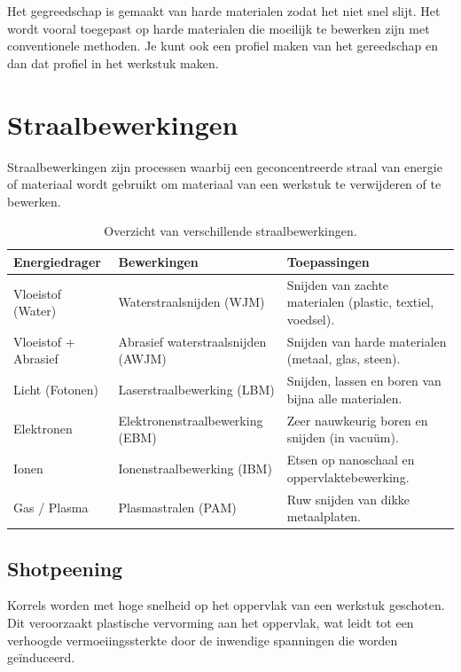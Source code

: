 \documentclass[a4paper,12pt,twoside]{report}
\begin{document}
Het gegreedschap is gemaakt van harde materialen zodat het niet snel slijt.
\newline
Het wordt vooral toegepast op harde materialen die moeilijk te bewerken zijn met conventionele methoden.
\newline
Je kunt ook een profiel maken van het gereedschap en dan dat profiel in het werkstuk maken.
\newline


\section{Straalbewerkingen}
Straalbewerkingen zijn processen waarbij een geconcentreerde straal van energie of materiaal wordt gebruikt om materiaal van een werkstuk te verwijderen of te bewerken.


\begin{table}[ht]
	\centering
	\caption{Overzicht van verschillende straalbewerkingen.}
	\label{tab:straalbewerkingen}
	\begin{tabularx}{\textwidth}{|l|X|X|}
		\hline
		\textbf{Energiedrager} & \textbf{Bewerkingen}               & \textbf{Toepassingen}                                      \\
		\hline
		Vloeistof (Water)      & Waterstraalsnijden (WJM)           & Snijden van zachte materialen (plastic, textiel, voedsel). \\
		\hline
		Vloeistof + Abrasief   & Abrasief waterstraalsnijden (AWJM) & Snijden van harde materialen (metaal, glas, steen).        \\
		\hline
		Licht (Fotonen)        & Laserstraalbewerking (LBM)         & Snijden, lassen en boren van bijna alle materialen.        \\
		\hline
		Elektronen             & Elektronenstraalbewerking (EBM)    & Zeer nauwkeurig boren en snijden (in vacuüm).              \\
		\hline
		Ionen                  & Ionenstraalbewerking (IBM)         & Etsen op nanoschaal en oppervlaktebewerking.               \\
		\hline
		Gas / Plasma           & Plasmastralen (PAM)                & Ruw snijden van dikke metaalplaten.                        \\
		\hline
	\end{tabularx}
\end{table}

\subsection{Shotpeening}
Korrels worden met hoge snelheid op het oppervlak van een werkstuk geschoten.
Dit veroorzaakt plastische vervorming aan het oppervlak, wat leidt tot een verhoogde vermoeiingssterkte
door de inwendige spanningen die worden geïnduceerd.
\end{document}
